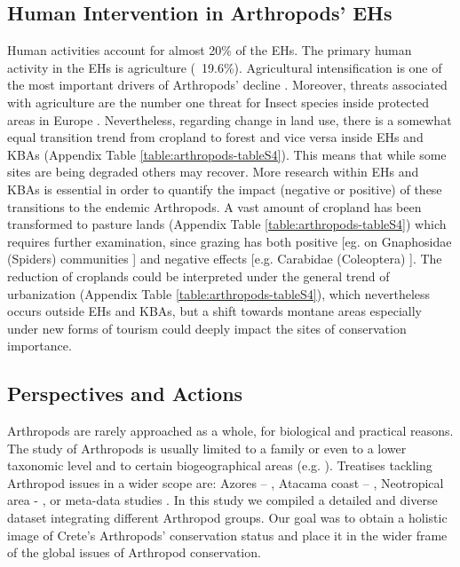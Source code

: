     \subsection{Human Intervention in Arthropods’ EHs}
    \label{subsec:arthropods-human-intervention-ehs}
Human activities account for almost 20\% of the EHs. The primary human activity
in the EHs is agriculture (~19.6\%). Agricultural intensification is one of the
most important drivers of Arthropods’ decline \parencite{bruhl2019biodiversity,habel2019agricultural,raven2021agricultural}.
Moreover, threats associated with agriculture are the number one threat for
Insect species inside protected areas in Europe \parencite{chowdhury2023protected}.
Nevertheless, regarding change in land use, there is a somewhat equal
transition trend from cropland to forest and vice versa inside EHs and KBAs
(Appendix Table \ref{table:arthropods-tableS4}). This means that while some sites are being
degraded others may recover. More research within EHs and KBAs is essential in
order to quantify the impact (negative or positive) of these transitions to the
endemic Arthropods. A vast amount of cropland has been transformed to pasture
lands (Appendix Table \ref{table:arthropods-tableS4}) which requires further examination,
since grazing has both positive [eg. on Gnaphosidae (Spiders) communities \parencite{kaltsas2019overgrazed}]
and negative effects [e.g. Carabidae (Coleoptera) \parencite{kaltsas2013ground}].
The reduction of croplands could be interpreted under the general trend of
urbanization (Appendix Table \ref{table:arthropods-tableS4}), which nevertheless occurs
outside EHs and KBAs, but a shift towards montane areas especially under new
forms of tourism could deeply impact the sites of conservation importance.
    
    \subsection{Perspectives and Actions}
    \label{subsec:arthropods-perspectives-actions}

Arthropods are rarely approached as a whole, for biological and practical
reasons. The study of Arthropods is usually limited to a family or even to a
lower taxonomic level and to certain biogeographical areas (e.g. \textcite{borges2017conservation,borges2018species}).
Treatises tackling Arthropod issues in a wider scope are: Azores – \textcite{gaspar2011selection},
Atacama coast – \textcite{pizarro-araya2021a-fine-scale}, Neotropical area - \textcite{barahona-segovia2021an-overview},
or meta-data studies \parencite{chowdhury2023three-quarters,klink2020meta-analysis}.
In this study
we compiled a detailed and diverse dataset integrating different Arthropod groups.
Our goal was to obtain a holistic image of Crete’s Arthropods’ conservation
status and place it in the wider frame of the global issues of Arthropod conservation.

